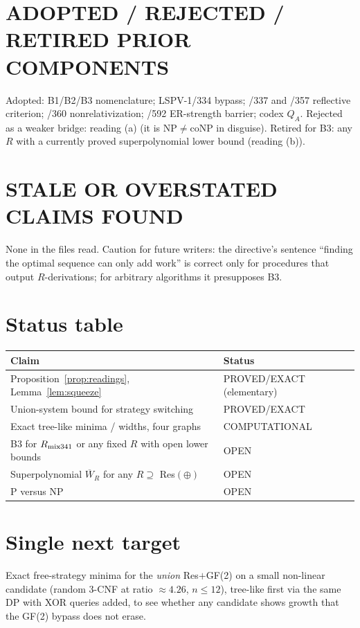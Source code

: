 \documentclass[11pt]{article}
\newcommand{\W}{\overline W}
\begin{document}
\section*{ADOPTED / REJECTED / RETIRED PRIOR COMPONENTS}
Adopted: B1/B2/B3 nomenclature; LSPV-1/334 bypass; /337 and /357 reflective
criterion; /360 nonrelativization; /592 ER-strength barrier; codex $Q_A$.
Rejected as a weaker bridge: reading (a) (it is NP$\neq$coNP in disguise).
Retired for B3: any $R$ with a currently proved superpolynomial lower bound
(reading (b)).

\section*{STALE OR OVERSTATED CLAIMS FOUND}
None in the files read. Caution for future writers: the directive's sentence
``finding the optimal sequence can only add work'' is correct only for
procedures that output $R$-derivations; for arbitrary algorithms it presupposes
B3.

\section*{Status table}
\begin{center}
\begin{tabular}{p{}p{}}
\toprule
Claim & Status\\
\midrule
Proposition~\ref{prop:readings}, Lemma~\ref{lem:squeeze} & PROVED/EXACT (elementary)\\
Union-system bound for strategy switching & PROVED/EXACT\\
Exact tree-like minima / widths, four graphs & COMPUTATIONAL\\
B3 for $R_{\rm mix341}$ or any fixed $R$ with open lower bounds & OPEN\\
Superpolynomial $\W_R$ for any $R\supseteq$ Res$(\oplus)$ & OPEN\\
P versus NP & OPEN\\
\bottomrule
\end{tabular}
\end{center}

\section*{Single next target}
Exact free-strategy minima for the \emph{union} Res$+$GF(2) on a small
non-linear candidate (random 3-CNF at ratio $\approx 4.26$, $n\le 12$),
tree-like first via the same DP with XOR queries added, to see whether any
candidate shows growth that the GF(2) bypass does not erase.
\end{document}
